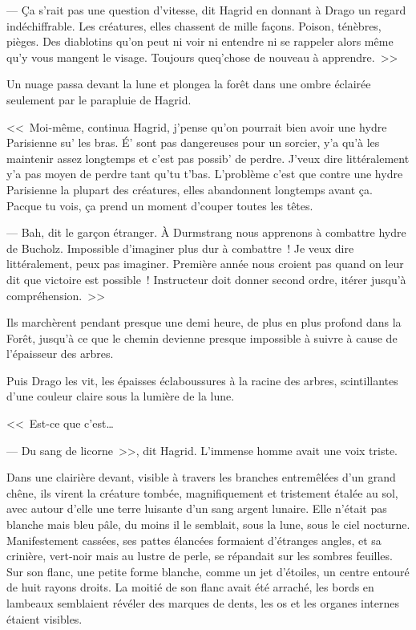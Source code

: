--- Ça s'rait pas une question d'vitesse, dit Hagrid en donnant à Drago un regard indéchiffrable. Les créatures, elles chassent de mille façons. Poison, ténèbres, pièges. Des diablotins qu'on peut ni voir ni entendre ni se rappeler alors même qu'y vous mangent le visage. Toujours queq'chose de nouveau à apprendre.~>>

Un nuage passa devant la lune et plongea la forêt dans une ombre éclairée seulement par le parapluie de Hagrid.

<<~Moi-même, continua Hagrid, j'pense qu'on pourrait bien avoir une hydre Parisienne su' les bras. É' sont pas dangereuses pour un sorcier, y'a qu'à les maintenir assez longtemps et c'est pas possib' de perdre. J'veux dire littéralement y'a pas moyen de perdre tant qu'tu t'bas. L'problème c'est que contre une hydre Parisienne la plupart des créatures, elles abandonnent longtemps avant ça. Pacque tu vois, ça prend un moment d'couper toutes les têtes.

--- Bah, dit le garçon étranger. À Durmstrang nous apprenons à combattre hydre de Bucholz. Impossible d'imaginer plus dur à combattre~! Je veux dire littéralement, peux pas imaginer. Première année nous croient pas quand on leur dit que victoire est possible~! Instructeur doit donner second ordre, itérer jusqu'à compréhension.~>>

Ils marchèrent pendant presque une demi heure, de plus en plus profond dans la Forêt, jusqu'à ce que le chemin devienne presque impossible à suivre à cause de l'épaisseur des arbres.

Puis Drago les vit, les épaisses éclaboussures à la racine des arbres, scintillantes d'une couleur claire sous la lumière de la lune.

<<~Est-ce que c'est…

--- Du sang de licorne~>>, dit Hagrid. L'immense homme avait une voix triste.

Dans une clairière devant, visible à travers les branches entremêlées d'un grand chêne, ils virent la créature tombée, magnifiquement et tristement étalée au sol, avec autour d'elle une terre luisante d'un sang argent lunaire. Elle n'était pas blanche mais bleu pâle, du moins il le semblait, sous la lune, sous le ciel nocturne. Manifestement cassées, ses pattes élancées formaient d'étranges angles, et sa crinière, vert-noir mais au lustre de perle, se répandait sur les sombres feuilles. Sur son flanc, une petite forme blanche, comme un jet d'étoiles, un centre entouré de huit rayons droits. La moitié de son flanc avait été arraché, les bords en lambeaux semblaient révéler des marques de dents, les os et les organes internes étaient visibles.

